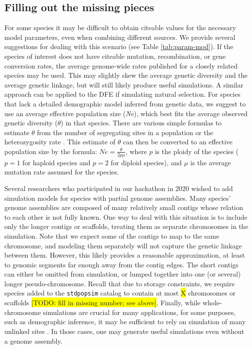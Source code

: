 \documentclass[hidelinks]{article}
\newcommand{\stdpopsim}{\texttt{stdpopsim}\xspace}
\begin{document}
\subsection*{Filling out the missing pieces}

For some species it may be difficult to obtain citeable values for the necessary model parameters, even when combining different sources. We provide several suggestions for dealing with this scenario (see Table \ref{tab:param-mod}).
If the species of interest does not have citeable mutation, recombination, or gene conversion rates, the average genome-wide rates published for a closely related species may be used. This may slightly skew the average genetic diversity and the average genetic linkage, but will still likely produce useful simulations. A similar approach can be applied to the DFE if simulating natural selection.
For species that lack a detailed demographic model inferred from genetic data, we suggest to use an average effective population size (\emph{Ne}), which best fits the average observed genetic diversity ($\theta$) in that species. There are various simple formulas to estimate $\theta$ from the number of segregating sites in a population \citep{Watterson1975} or the heterozygosity rate \citep{nei1979mathematical, tajima1983evolutionary}. This estimate of $\theta$ can then be converted to an effective population size by the formula: $Ne=\frac {\theta} {2p\mu}$, where $p$ is the ploidy of the species ($p=1$ for haploid species and $p=2$ for diploid species), and $\mu$ is the average mutation rate assumed for the species.

Several researchers who participated in our hackathon in 2020 wished to add simulation models for species with partial genome assemblies. Many species' genome assemblies
are composed of many relatively small contigs whose relation to each
other is not fully known. One way to deal with this situation is to include only the  longer contigs or scaffolds, treating them as separate chromosomes in the simulation. Note that we expect some of the contigs to map to the same chromosome, and modeling them separately will not capture the genetic linkage between them. However, this likely provides a reasonable approximation, at least to genomic segments far enough away from the contig edges. The short contigs can either be omitted from simulation, or lumped together into one (or several) longer pseudo-chromosome. Recall that due to storage constraints, we require species added to the \stdpopsim catalog to contain at most \colorbox{yellow}{X} chromosomes or scaffolds \colorbox{yellow}{[TODO: fill in missing number; see above]}. Finally, while whole-chromosome simulations are crucial for many applications, for some purposes, such as demographic inference, it may be sufficient to rely on simulation  of many unlinked sites \citep{Gutenkunst2009,Excoffier2013}. In those cases, one may generate useful simulations even without a genome assembly.
\end{document}
